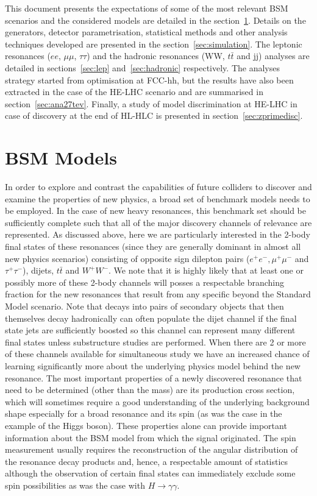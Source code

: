 \documentclass[a4paper,11pt]{article}
\begin{document}
This document presents the expectations of some of the most relevant BSM scenarios and the considered models are detailed in the section~\ref{sec:bsmmodels}.
Details on the generators, detector parametrisation, statistical methods and other analysis techniques developed are presented in the section~\ref{sec:simulation}.
The leptonic resonances ($ee$, $\mu\mu$, $\tau\tau$) and the hadronic resonances (WW, $t\bar{t}$ and jj) analyses are detailed in sections~\ref{sec:lep} and~\ref{sec:hadronic} respectively.
The analyses strategy started from optimisation at FCC-hh, but the results have also been extracted in the case of the HE-LHC scenario and are summarised in section~\ref{sec:ana27tev}.
Finally, a study of model discrimination at HE-LHC in case of discovery at the end of HL-HLC is presented in section~\ref{sec:zprimedisc}.

\section{BSM Models}
\label{sec:bsmmodels}

In order to explore and contrast the capabilities of future colliders to discover and examine the properties of new physics, a broad set of benchmark models needs to be employed. In the
case of new heavy resonances, this benchmark set should be sufficiently complete such that all of the major discovery channels of relevance are represented. As discussed above, here we
are particularly interested in the 2-body final states of these resonances (since they are generally dominant in almost all new physics scenarios) consisting of opposite sign dilepton
pairs ($e^+e^-, \mu^+\mu^-$ and $\tau^+\tau^-$), dijets, $ t\bar t$ and $W^+W^-$.  We note that it is highly likely that at least one or possibly more of these 2-body channels will posses
a respectable branching fraction for the new resonances that result from any specific beyond the Standard Model scenario. Note that decays into pairs of secondary objects that
then themselves decay hadronically can often populate the dijet channel if the final state jets are sufficiently boosted so this channel can represent many different final states unless
substructure studies are performed.  When there are 2 or more of these channels available for simultaneous study we have an increased chance of learning significantly more about
the underlying physics model behind the new resonance. The most important properties of a newly discovered resonance that need to be determined (other than the mass) are its
production cross section, which will sometimes require a good understanding of the underlying background shape especially for a broad resonance and its spin (as was the case in
the example of the Higgs boson). These properties alone can provide important information about the BSM model from which the signal originated. The spin measurement usually requires
the reconstruction of the angular distribution of the resonance decay products and, hence, a respectable amount of statistics although the observation of certain final states can
immediately exclude some spin possibilities as was the case with $H\rightarrow \gamma \gamma$.
\end{document}
